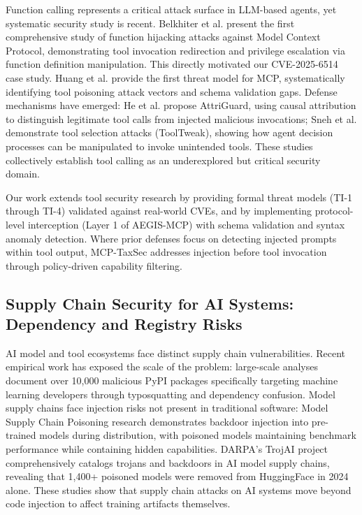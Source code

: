 \documentclass[12pt,twocolumn,journal]{IEEEtran}
\begin{document}
Function calling represents a critical attack surface in LLM-based agents, yet systematic security study is recent. Belkhiter et al. \cite{Belkhiter2026} present the first comprehensive study of function hijacking attacks against Model Context Protocol, demonstrating tool invocation redirection and privilege escalation via function definition manipulation. This directly motivated our CVE-2025-6514 case study. Huang et al. \cite{Huang2026} provide the first threat model for MCP, systematically identifying tool poisoning attack vectors and schema validation gaps. Defense mechanisms have emerged: He et al. \cite{He2026} propose AttriGuard, using causal attribution to distinguish legitimate tool calls from injected malicious invocations; Sneh et al. \cite{Sneh2025} demonstrate tool selection attacks (ToolTweak), showing how agent decision processes can be manipulated to invoke unintended tools. These studies collectively establish tool calling as an underexplored but critical security domain.

Our work extends tool security research by providing formal threat models (TI-1 through TI-4) validated against real-world CVEs, and by implementing protocol-level interception (Layer 1 of AEGIS-MCP) with schema validation and syntax anomaly detection. Where prior defenses focus on detecting injected prompts within tool output, MCP-TaxSec addresses injection before tool invocation through policy-driven capability filtering.

\subsection{Supply Chain Security for AI Systems: Dependency and Registry Risks}

AI model and tool ecosystems face distinct supply chain vulnerabilities. Recent empirical work has exposed the scale of the problem: large-scale analyses \cite{Chen2024} document over 10,000 malicious PyPI packages specifically targeting machine learning developers through typosquatting and dependency confusion. Model supply chains face injection risks not present in traditional software: Model Supply Chain Poisoning research \cite{He2024} demonstrates backdoor injection into pre-trained models during distribution, with poisoned models maintaining benchmark performance while containing hidden capabilities. DARPA's TrojAI project \cite{TrojAI2026} comprehensively catalogs trojans and backdoors in AI model supply chains, revealing that 1,400+ poisoned models were removed from HuggingFace in 2024 alone. These studies show that supply chain attacks on AI systems move beyond code injection to affect training artifacts themselves.
\end{document}
